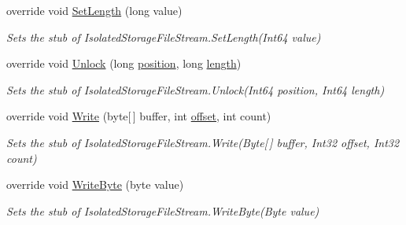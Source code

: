 \begin{DoxyCompactItemize}
override void \hyperlink{class_system_1_1_i_o_1_1_isolated_storage_1_1_fakes_1_1_stub_isolated_storage_file_stream_ab321ff880e442e418394cbe622aa4ce2}{Set\-Length} (long value)
\begin{DoxyCompactList}\small\item\em Sets the stub of Isolated\-Storage\-File\-Stream.\-Set\-Length(\-Int64 value)\end{DoxyCompactList}\item 
override void \hyperlink{class_system_1_1_i_o_1_1_isolated_storage_1_1_fakes_1_1_stub_isolated_storage_file_stream_a1300a07994532af245c1ef662aa2b722}{Unlock} (long \hyperlink{jquery-1_810_82-vsdoc_8js_a0a2a38b3281bb5c9cf0c479a04b513cb}{position}, long \hyperlink{jquery-1_810_82-vsdoc_8js_aa7de35d58da66d9944ab9cbe82c19640}{length})
\begin{DoxyCompactList}\small\item\em Sets the stub of Isolated\-Storage\-File\-Stream.\-Unlock(\-Int64 position, Int64 length)\end{DoxyCompactList}\item 
override void \hyperlink{class_system_1_1_i_o_1_1_isolated_storage_1_1_fakes_1_1_stub_isolated_storage_file_stream_a40fd38c2d7feac54960fdcf0c2e66379}{Write} (byte\mbox{[}$\,$\mbox{]} buffer, int \hyperlink{jquery-1_810_82_8js_a4a9f594d20d927164551fc7fa4751a2f}{offset}, int count)
\begin{DoxyCompactList}\small\item\em Sets the stub of Isolated\-Storage\-File\-Stream.\-Write(\-Byte\mbox{[}$\,$\mbox{]} buffer, Int32 offset, Int32 count)\end{DoxyCompactList}\item 
override void \hyperlink{class_system_1_1_i_o_1_1_isolated_storage_1_1_fakes_1_1_stub_isolated_storage_file_stream_a5ad4379901135ee0c7f640e3e805bcb7}{Write\-Byte} (byte value)
\begin{DoxyCompactList}\small\item\em Sets the stub of Isolated\-Storage\-File\-Stream.\-Write\-Byte(\-Byte value)\end{DoxyCompactList}\end{DoxyCompactItemize}
